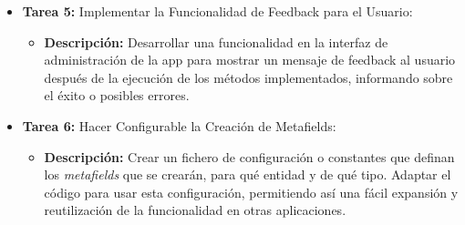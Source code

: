 \documentclass[12pt]{article}
\begin{document}
\begin{itemize}
\begin{itemize}[label=--]
          \end{itemize}
    \item \textbf{Tarea 5:} Implementar la Funcionalidad de Feedback para el Usuario:
          \begin{itemize}[label=--]
              \item \textbf{Descripción:} Desarrollar una funcionalidad en la interfaz de administración de la app para mostrar un mensaje de feedback al usuario después de la ejecución de los métodos implementados, informando sobre el éxito o posibles errores.
          \end{itemize}
    \item \textbf{Tarea 6:} Hacer Configurable la Creación de Metafields:
          \begin{itemize}[label=--]
              \item \textbf{Descripción:} Crear un fichero de configuración o constantes que definan los \textit{metafields} que se crearán, para qué entidad y de qué tipo. Adaptar el código para usar esta configuración, permitiendo así una fácil expansión y reutilización de la funcionalidad en otras aplicaciones.
          \end{itemize}
\end{itemize}
\end{document}
